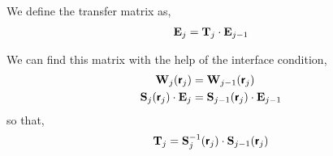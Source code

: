 
We define the transfer matrix as,
\begin{align*}
	\vb{E}_j = \vb{T}_j \cdot \vb{E}_{j-1}
\end{align*}

We can find this matrix with the help of the interface condition,
\begin{align*}
	\vb{W}_j\pqty{\boldsymbol{\mathsf{r}}_j}                & = \vb{W}_{j-1}\pqty{\boldsymbol{\mathsf{r}}_j}                    \\
	\vb{S}_j\pqty{\boldsymbol{\mathsf{r}}_j} \cdot \vb{E}_j & = \vb{S}_{j-1}\pqty{\boldsymbol{\mathsf{r}}_j} \cdot \vb{E}_{j-1}
\end{align*} so that,
\begin{align*}
	\vb{T}_j = \vb{S}^{-1}_j\pqty{\boldsymbol{\mathsf{r}}_j} \cdot\vb{S}_{j-1}\pqty{\boldsymbol{\mathsf{r}}_j}
\end{align*}


